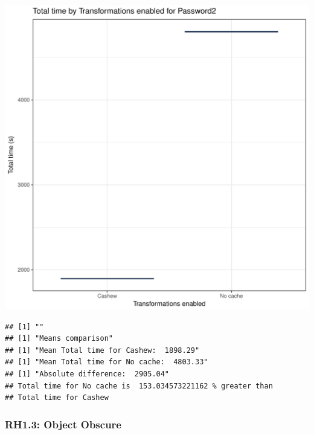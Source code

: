 \documentclass{article}\usepackage[]{graphicx}\usepackage[]{color}
\makeatletter
\def\maxwidth{ %
  \ifdim\Gin@nat@width>\linewidth
    \linewidth
  \else
    \Gin@nat@width
  \fi
}
\newenvironment{kframe}{%
 \def\at@end@of@kframe{}%
 \ifinner\ifhmode%
  \def\at@end@of@kframe{\end{minipage}}%
  \begin{minipage}{\columnwidth}%
 \fi\fi%
 \def\FrameCommand##1{\hskip\@totalleftmargin \hskip-\fboxsep
 \colorbox{shadecolor}{##1}\hskip-\fboxsep
     \hskip-\linewidth \hskip-\@totalleftmargin \hskip\columnwidth}%
 \MakeFramed {\advance\hsize-\width
   \@totalleftmargin\z@ \linewidth\hsize
   \@setminipage}}%
 {\par\unskip\endMakeFramed%
 \at@end@of@kframe}
\newenvironment{knitrout}{}{} %
\makeatother
\begin{document}
\begin{knitrout}
\color{fgcolor}
\includegraphics[width=\maxwidth]{figure/RH1_password2-1} 
\begin{kframe}

{\ttfamily\noindent\bfseries\color{errorcolor}{\#\# Error in eval(expr, envir, enclos): object 'shap\_cashew\_password2' not found}}\begin{verbatim}
## [1] ""
## [1] "Means comparison"
## [1] "Mean Total time for Cashew:  1898.29"
## [1] "Mean Total time for No cache:  4803.33"
## [1] "Absolute difference:  2905.04"
## Total time for No cache is  153.034573221162 % greater than 
## Total time for Cashew
\end{verbatim}
\end{kframe}
\end{knitrout}


\subsubsection{RH1.3: Object Obscure}
\end{document}
